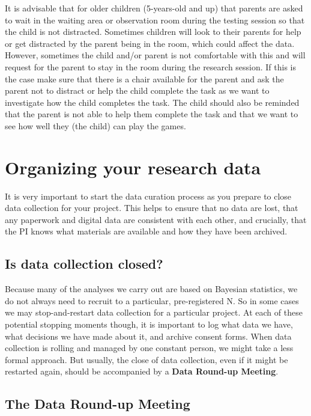 \documentclass[
  12pt,
]{book}
\begin{document}
It is advisable that for older children (5-years-old and up) that parents are asked to wait in the waiting area or observation room during the testing session so that the child is not distracted. Sometimes children will look to their parents for help or get distracted by the parent being in the room, which could affect the data. However, sometimes the child and/or parent is not comfortable with this and will request for the parent to stay in the room during the research session. If this is the case make sure that there is a chair available for the parent and ask the parent not to distract or help the child complete the task as we want to investigate how the child completes the task. The child should also be reminded that the parent is not able to help them complete the task and that we want to see how well they (the child) can play the games.

\chapter{Organizing your research data}\label{organizing-your-research-data}

It is very important to start the data curation process as you prepare to close data collection for your project. This helps to ensure that no data are lost, that any paperwork and digital data are consistent with each other, and crucially, that the PI knows what materials are available and how they have been archived.

\section{Is data collection closed?}\label{is-data-collection-closed}

Because many of the analyses we carry out are based on Bayesian statistics, we do not always need to recruit to a particular, pre-registered N. So in some cases we may stop-and-restart data collection for a particular project. At each of these potential stopping moments though, it is important to log what data we have, what decisions we have made about it, and archive consent forms. When data collection is rolling and managed by one constant person, we might take a less formal approach. But usually, the close of data collection, even if it might be restarted again, should be accompanied by a \textbf{Data Round-up Meeting}.

\section{The Data Round-up Meeting}\label{the-data-round-up-meeting}
\end{document}
